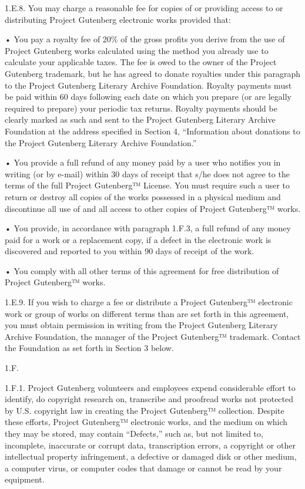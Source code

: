 \documentclass[12pt,openright]{book}
\begin{document}
1.E.8. You may charge a reasonable fee for copies of or providing access to or distributing Project Gutenberg electronic works provided that:

• You pay a royalty fee of 20\% of the gross profits you derive from the use of Project Gutenberg works calculated using the method you already use to calculate your applicable taxes. The fee is owed to the owner of the Project Gutenberg trademark, but he has agreed to donate royalties under this paragraph to the Project Gutenberg Literary Archive Foundation. Royalty payments must be paid within 60 days following each date on which you prepare (or are legally required to prepare) your periodic tax returns. Royalty payments should be clearly marked as such and sent to the Project Gutenberg Literary Archive Foundation at the address specified in Section 4, “Information about donations to the Project Gutenberg Literary Archive Foundation.”

• You provide a full refund of any money paid by a user who notifies you in writing (or by e-mail) within 30 days of receipt that s/he does not agree to the terms of the full Project Gutenberg™ License. You must require such a user to return or destroy all copies of the works possessed in a physical medium and discontinue all use of and all access to other copies of Project Gutenberg™ works.

• You provide, in accordance with paragraph 1.F.3, a full refund of any money paid for a work or a replacement copy, if a defect in the electronic work is discovered and reported to you within 90 days of receipt of the work.

• You comply with all other terms of this agreement for free distribution of Project Gutenberg™ works.

1.E.9. If you wish to charge a fee or distribute a Project Gutenberg™ electronic work or group of works on different terms than are set forth in this agreement, you must obtain permission in writing from the Project Gutenberg Literary Archive Foundation, the manager of the Project Gutenberg™ trademark. Contact the Foundation as set forth in Section 3 below.

1.F.

1.F.1. Project Gutenberg volunteers and employees expend considerable effort to identify, do copyright research on, transcribe and proofread works not protected by U.S. copyright law in creating the Project Gutenberg™ collection. Despite these efforts, Project Gutenberg™ electronic works, and the medium on which they may be stored, may contain “Defects,” such as, but not limited to, incomplete, inaccurate or corrupt data, transcription errors, a copyright or other intellectual property infringement, a defective or damaged disk or other medium, a computer virus, or computer codes that damage or cannot be read by your equipment.
\end{document}
